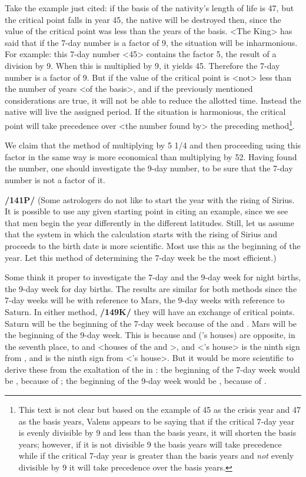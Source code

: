 Take the example just cited: if the basis of the nativity’s length of life is 47, but the critical point falls in year 45, the native will be destroyed then, since the value of the critical point was less than the years of the basis. <The King> has said that if the 7-day number is a factor of 9, the situation will be inharmonious. For example: this 7-day number <45> contains the factor 5, the result of a division by
9. When this is multiplied by 9, it yields 45. Therefore the 7-day number is a factor of 9. But if the value of the critical point is <not> less than the number of years <of the basis>, and if the previously mentioned considerations are true, it will not be able to reduce the allotted time. Instead the native will live the assigned period. If the situation is harmonious, the critical point will take precedence over <the
number found by> the preceding method\footnote{This text is not clear but based on the example of 45 as the crisis year and 47 as the basis years, Valens appears to be saying that if the critical 7-day year is evenly divisible by 9 and less than the basis years, it will shorten the basis years; however, if it is not divisible 9 the basis years will take precedence while if the critical 7-day year is greater than the basis years and \textsl{not} evenly divisible by 9 it will take precedence over the basis years.}.

We claim that the method of multiplying by 5 1/4 and then proceeding using this factor in the same way is more economical than multiplying by 52. Having found the number, one should investigate the 9-day number, to be sure that the 7-day number is not a factor of it.

\textbf{/141P/} (Some astrologers do not like to start the year with the rising of Sirius. It is possible to use any given starting point in citing an example, since we see that men begin the year differently in the different latitudes. Still, let us assume that the system in which the calculation starts with the rising of Sirius and proceeds to the birth date is more scientific. Most use this as the beginning of the year. Let this method of determining the 7-day week be the most efficient.)

Some think it proper to investigate the 7-day and the 9-day week for night births, the 9-day week for day births. The results are similar for both methods since the 7-day weeks will be with reference to Mars, the 9-day weeks with reference to Saturn. In either method, \textbf{/149K/} they will have an exchange of critical points. Saturn will be the beginning of the 7-day week because of the \Sun\xspace and \Moon. Mars will be the beginning of the 9-day week. This is because \Capricorn\xspace and \Aquarius\xspace (\Saturn’s houses) are opposite, in the seventh place, to \Cancer\xspace and \Leo\xspace <houses of the \Sun\xspace and \Moon>, and \Aries\xspace <\Mars’s house> is the ninth sign from \Leo, and \Cancer\xspace is the ninth sign from \Scorpio\xspace <\Mars’s house>. But it would be more scientific to derive these from the exaltation of the \Moon\xspace in \Taurus: the beginning of the 7-day week would be \Mars, because of \Scorpio; the beginning of the 9-day week would be \Saturn, because of \Capricorn.

